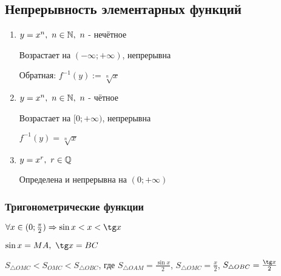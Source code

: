 \subsection{Непрерывность элементарных функций}

\begin{enumerate}
	\item $y = x^n,\ n \in \mathbb{N},\ n$ - нечётное
	
	Возрастает на $(-\infty; +\infty)$, непрерывна
	
	Обратная: $f^{-1}(y) := \sqrt[n]{x}$
	
	\item $y = x^n,\ n \in \mathbb{N},\ n$ - чётное
	
	Возрастает на $[0; +\infty)$, непрерывна
	
	$f^{-1}(y) = \sqrt[n]{x}$
	
	\item $y = x^r,\ r \in \mathbb{Q}$
	
	Определена и непрерывна на $(0; +\infty)$
\end{enumerate}

\subsubsection*{Тригонометрические функции}

\begin{lemma}
	$\forall x \in (0; \frac{\pi}{2}) \Ra \sin x < x < \tg x$
	
	$\sin x = MA,\ \tg x = BC$
	
	$S_{\triangle OMC} < S_{OMC} < S_{\triangle OBC}$, где $S_{\triangle OAM} = \frac{\sin x}{2}$, $S_{\triangle OMC} = \frac{x}{2}$, $S_{\triangle OBC} = \frac{\tg x}{2}$
\end{lemma}